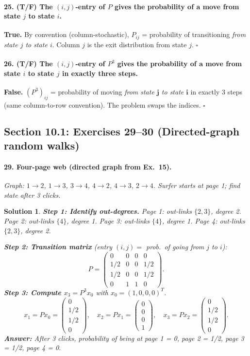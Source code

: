 \documentclass[11pt,a4paper]{article}
\theoremstyle{sol}
\newtheorem*{solution}{Solution}
\begin{document}
\paragraph{25. (T/F) The $(i,j)$-entry of $P$ gives the probability of a move from state $j$ to state $i$.}
\textbf{True.} By convention (column-stochastic), $P_{ij}$ = probability of transitioning \emph{from state $j$ to state $i$}. Column $j$ is the exit distribution from state $j$. $\square$

\paragraph{26. (T/F) The $(i,j)$-entry of $P^3$ gives the probability of a move from state $i$ to state $j$ in exactly three steps.}
\textbf{False.} $(P^3)_{ij}$ = probability of moving \emph{from state $\mathbf{j}$ to state $\mathbf{i}$} in exactly 3 steps (same column-to-row convention). The problem swaps the indices. $\square$

\clearpage
\subsection{Section 10.1: Exercises 29--30 (Directed-graph random walks)}

\paragraph{29. Four-page web (directed graph from Ex.\ 15).}
\textit{Graph: $1\to2$, $1\to3$, $3\to4$, $4\to2$, $4\to3$, $2\to4$. Surfer starts at page 1; find state after 3 clicks.}

\begin{solution}
\textbf{Step 1: Identify out-degrees.}
Page 1: out-links $\{2,3\}$, degree 2.
Page 2: out-links $\{4\}$, degree 1.
Page 3: out-links $\{4\}$, degree 1.
Page 4: out-links $\{2,3\}$, degree 2.

\textbf{Step 2: Transition matrix} (entry $(i,j)=$ prob.\ of going from $j$ to $i$):
\[
P=\begin{pmatrix}0&0&0&0\\1/2&0&0&1/2\\1/2&0&0&1/2\\0&1&1&0\end{pmatrix}.
\]
\textbf{Step 3: Compute $x_3=P^3x_0$} with $x_0=(1,0,0,0)^T$.
\[
x_1=P x_0=\begin{pmatrix}0\\1/2\\1/2\\0\end{pmatrix},\quad
x_2=P x_1=\begin{pmatrix}0\\0\\0\\1\end{pmatrix},\quad
x_3=P x_2=\begin{pmatrix}0\\1/2\\1/2\\0\end{pmatrix}.
\]
\textbf{Answer:} After 3 clicks, probability of being at page 1 = 0, page 2 = 1/2, page 3 = 1/2, page 4 = 0.
\end{solution}
\end{document}
